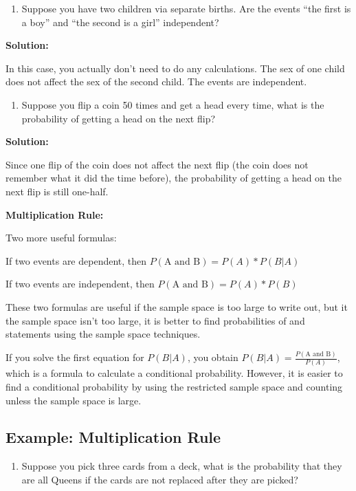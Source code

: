 \documentclass[
]{book}
\providecommand{\tightlist}{%
  \setlength{\itemsep}{0pt}\setlength{\parskip}{0pt}}
\begin{document}
\begin{enumerate}
\def\labelenumi{\alph{enumi}.}
\setcounter{enumi}{4}
\tightlist
\item
  Suppose you have two children via separate births. Are the events ``the first is a boy'' and ``the second is a girl'' independent?
\end{enumerate}

\textbf{Solution:}

In this case, you actually don't need to do any calculations. The sex of one child does not affect the sex of the second child. The events are independent.

\begin{enumerate}
\def\labelenumi{\alph{enumi}.}
\setcounter{enumi}{5}
\tightlist
\item
  Suppose you flip a coin 50 times and get a head every time, what is the probability of getting a head on the next flip?
\end{enumerate}

\textbf{Solution:}

Since one flip of the coin does not affect the next flip (the coin does not remember what it did the time before), the probability of getting a head on the next flip is still one-half.

\textbf{Multiplication Rule:}

Two more useful formulas:

If two events are dependent, then \(P(\text{A and B})=P(A)*P(B|A)\)

If two events are independent, then \(P(\text{A and B})=P(A)*P(B)\)

These two formulas are useful if the sample space is too large to write out, but it the sample space isn't too large, it is better to find probabilities of and statements using the sample space techniques.

If you solve the first equation for \(P(B|A)\), you obtain \(P(B|A)=\frac{P(\text{A and B})}{P(A)}\), which is a formula to calculate a conditional probability. However, it is easier to find a conditional probability by using the restricted sample space and counting unless the sample space is large.

\hypertarget{example-multiplication-rule}{%
\subsection{Example: Multiplication Rule}\label{example-multiplication-rule}}

\begin{enumerate}
\def\labelenumi{\alph{enumi}.}
\tightlist
\item
  Suppose you pick three cards from a deck, what is the probability that they are all Queens if the cards are not replaced after they are picked?
\end{enumerate}
\end{document}
